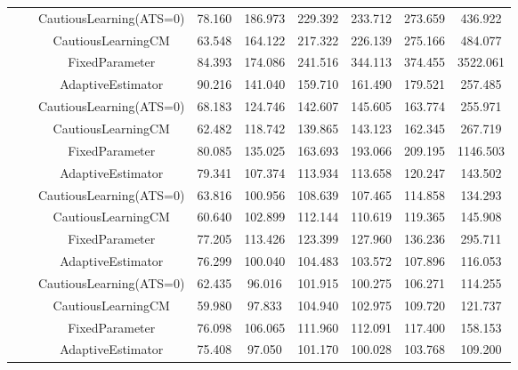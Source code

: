\begin{table}[!h]
\begin{tabular}[t]{ccccccccc}
 &  & CautiousLearning(ATS=0) & 78.160 & 186.973 & 229.392 & 233.712 & 273.659 & 436.922\\

 &  & CautiousLearningCM & 63.548 & 164.122 & 217.322 & 226.139 & 275.166 & 484.077\\

 & \multirow[t]{-4}{*}{\centering\arraybackslash 0.35} & FixedParameter & 84.393 & 174.086 & 241.516 & 344.113 & 374.455 & 3522.061\\
\cmidrule{2-9}
 &  & AdaptiveEstimator & 90.216 & 141.040 & 159.710 & 161.490 & 179.521 & 257.485\\

 &  & CautiousLearning(ATS=0) & 68.183 & 124.746 & 142.607 & 145.605 & 163.774 & 255.971\\

 &  & CautiousLearningCM & 62.482 & 118.742 & 139.865 & 143.123 & 162.345 & 267.719\\

 & \multirow[t]{-4}{*}{\centering\arraybackslash 0.50} & FixedParameter & 80.085 & 135.025 & 163.693 & 193.066 & 209.195 & 1146.503\\
\cmidrule{2-9}
 &  & AdaptiveEstimator & 79.341 & 107.374 & 113.934 & 113.658 & 120.247 & 143.502\\

 &  & CautiousLearning(ATS=0) & 63.816 & 100.956 & 108.639 & 107.465 & 114.858 & 134.293\\

 &  & CautiousLearningCM & 60.640 & 102.899 & 112.144 & 110.619 & 119.365 & 145.908\\

 & \multirow[t]{-4}{*}{\centering\arraybackslash 0.75} & FixedParameter & 77.205 & 113.426 & 123.399 & 127.960 & 136.236 & 295.711\\
\cmidrule{2-9}
 &  & AdaptiveEstimator & 76.299 & 100.040 & 104.483 & 103.572 & 107.896 & 116.053\\

 &  & CautiousLearning(ATS=0) & 62.435 & 96.016 & 101.915 & 100.275 & 106.271 & 114.255\\

 &  & CautiousLearningCM & 59.980 & 97.833 & 104.940 & 102.975 & 109.720 & 121.737\\

 & \multirow[t]{-4}{*}{\centering\arraybackslash 1.00} & FixedParameter & 76.098 & 106.065 & 111.960 & 112.091 & 117.400 & 158.153\\
\cmidrule{2-9}
 &  & AdaptiveEstimator & 75.408 & 97.050 & 101.170 & 100.028 & 103.768 & 109.200\\


\end{tabular}
\end{table}
